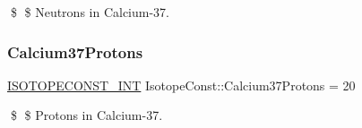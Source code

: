 \$ \$ Neutrons in Calcium-\/37. \mbox{\label{group___isotope_const-_calcium-_ca37_gaa17bf1cc29e912eb840c6ace94cd54f1}} 
\subsubsection{\texorpdfstring{Calcium37\+Protons}{Calcium37Protons}}
{\footnotesize\ttfamily \mbox{\hyperlink{group___isotope_const-_macros_ga5f18360b3e99483a35c32d789e62621c}{I\+S\+O\+T\+O\+P\+E\+C\+O\+N\+S\+T\+\_\+\+I\+NT}} Isotope\+Const\+::\+Calcium37\+Protons = 20}

\$ \$ Protons in Calcium-\/37. 